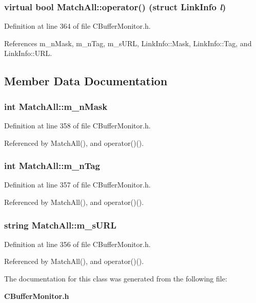 \subsubsection{\setlength{\rightskip}{0pt plus 5cm}virtual bool Match\-All::operator() (struct {\bf Link\-Info} {\em l})\hspace{0.3cm}{\tt  [inline, virtual]}}\label{classMatchAll_a1}




Definition at line 364 of file CBuffer\-Monitor.h.

References m\_\-n\-Mask, m\_\-n\-Tag, m\_\-s\-URL, Link\-Info::Mask, Link\-Info::Tag, and Link\-Info::URL.

\subsection{Member Data Documentation}
\subsubsection{\setlength{\rightskip}{0pt plus 5cm}int Match\-All::m\_\-n\-Mask\hspace{0.3cm}{\tt  [private]}}\label{classMatchAll_o2}




Definition at line 358 of file CBuffer\-Monitor.h.

Referenced by Match\-All(), and operator()().
\subsubsection{\setlength{\rightskip}{0pt plus 5cm}int Match\-All::m\_\-n\-Tag\hspace{0.3cm}{\tt  [private]}}\label{classMatchAll_o1}




Definition at line 357 of file CBuffer\-Monitor.h.

Referenced by Match\-All(), and operator()().
\subsubsection{\setlength{\rightskip}{0pt plus 5cm}string Match\-All::m\_\-s\-URL\hspace{0.3cm}{\tt  [private]}}\label{classMatchAll_o0}




Definition at line 356 of file CBuffer\-Monitor.h.

Referenced by Match\-All(), and operator()().

The documentation for this class was generated from the following file:\begin{CompactItemize}
\item 
{\bf CBuffer\-Monitor.h}\end{CompactItemize}
